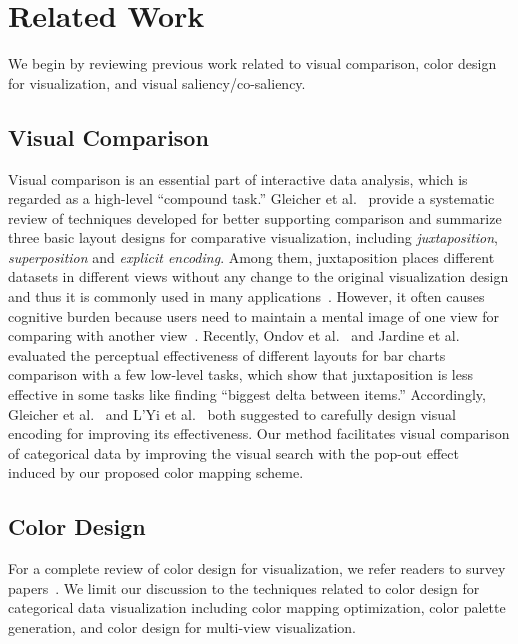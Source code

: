 \section {Related Work}
We begin by reviewing previous work related to visual comparison, color design for visualization, and
visual saliency/co-saliency.


\subsection{Visual Comparison}
Visual comparison is an essential part of interactive data analysis, which is regarded as a high-level ``compound task.'' Gleicher et al.~\cite{Gleicher11} provide a systematic review of techniques developed for better supporting comparison and summarize three basic layout designs for comparative visualization, including \emph{juxtaposition}, \emph{superposition} and \emph{explicit encoding}. Among them, juxtaposition places different datasets in different views without any change to the original visualization design and thus it is commonly used in many applications~\cite{munzner2003treejuxtaposer,Albers11,Lobo15}. However, it often causes cognitive burden because users need to maintain a mental image of one view for comparing with another view~\cite{LYi21}. Recently, Ondov et al.~\cite{Ondov19} and Jardine et al.~\cite{jardine2019perceptual} evaluated the perceptual effectiveness of different layouts for bar charts comparison with a few low-level tasks, which show that juxtaposition is less effective in some tasks like finding ``biggest delta between items.''
Accordingly, Gleicher et al.~\cite{Gleicher11} and  L'Yi et al.~\cite{LYi21} both suggested to carefully design visual encoding for improving its effectiveness. Our method facilitates visual comparison of categorical data by improving the visual search with the pop-out effect~\cite{enns1990three} induced by our proposed color mapping scheme.


\subsection{Color Design}
For a complete review of color design for visualization, we refer readers to survey papers~\cite{Tominski08,Zhou16}. We limit our discussion to the techniques related to color design for categorical data visualization including color mapping optimization, color palette generation, and color design for multi-view visualization.

